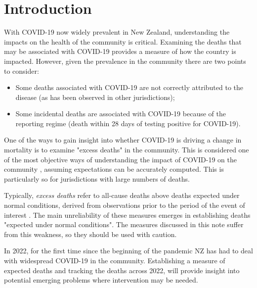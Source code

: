 \documentclass[
10pt, %
a4paper, %
oneside, %
DIV=16,
parskip=full,
headinclude,footinclude %
]{scrartcl}
\begin{document}
\section{Introduction}\label{sec:intro}

With COVID-19 now widely prevalent in New Zealand, understanding the impacts on the health of the community is critical. Examining the deaths that may be associated with COVID-19 provides a measure of how the country is impacted. However, given the prevalence in the community there are two points to consider:

\begin{itemize}
    \item Some deaths associated with COVID-19 are not correctly attributed to the disease (as has been observed in other jurisdictions);
    \item Some incidental deaths are associated with COVID-19 because of the reporting regime (death within 28 days of testing positive for COVID-19).
\end{itemize}

One of the ways to gain insight into whether COVID-19 is driving a change in mortality is to examine "excess deaths" in the community. This is considered one of the most objective ways of understanding the impact of COVID-19 on the community \cite{Bearny2020}, assuming expectations can be accurately computed. This is particularly so for jurisdictions with large numbers of deaths. 

Typically, \textit{excess deaths} refer to all-cause deaths above deaths expected under normal conditions, derived from observations prior to the period of the event of interest \cite{karlinsky2021tracking}. The main unreliability of these measures emerges in establishing deaths "expected under normal conditions". The measures discussed in this note suffer from this weakness, so they should be used with caution.

In 2022, for the first time since the beginning of the pandemic NZ has had to deal with widespread COVID-19 in the community. Establishing a measure of expected deaths and tracking the deaths across 2022, will provide insight into potential emerging problems where intervention may be needed.


\end{document}
